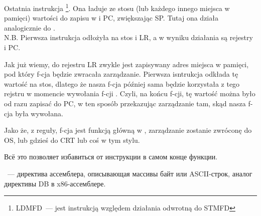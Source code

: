 Ostatnia instrukcja \footnote{\ac{LDMFD}~--- jest instrukcją względem działania odwrotną do \ac{STMFD}}.
Ona ładuje ze stosu (lub każdego innego miejsca w pamięci) wartości do zapisu w  i \ac{PC}, zwiększając  \ac{SP}.
Tutaj ona działa analogicznie do \POP.\\
N.B. Pierwsza instrukcja  odłożyła na stos  i \ac{LR}, a  w wyniku działania  są rejestry  i \ac{PC}.

Jak już wiemy, do rejestru \ac{LR} zwykle jest zapisywany adres miejsca w pamięci, pod który f-cja będzie zwracała zarządzanie.
Pierwsza isntrukcja odkłada tę wartość na stos, dlatego że nasza f-cja \main później sama będzie korzystała z tego rejstru w momencie wywołania f-cji \printf.
Czyli, na końcu f-cji, tę wartość można było od razu zapisać do \ac{PC}, w ten sposób przekazując zarządzanie tam, skąd nasza f-cja była wywołana.

Jako że, z reguły, f-cja \main jest funkcją główną w \CCpp, zarządzanie zostanie zwróconę do \ac{OS}, lub gdzieś do \ac{CRT} 
lub coś w tym stylu.

Всё это позволяет избавиться от инструкции  в самом конце функции.

~--- директива ассемблера, описывающая массивы байт или ASCII-строк, аналог директивы DB в x86-ассемблере.


